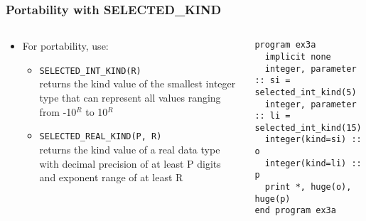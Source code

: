 \documentclass[10pt,aspectratio=169]{beamer}
\begin{document}
\begin{frame}[fragile]
  \frametitle{Portability with SELECTED\_KIND}
  \begin{columns}[T]
    \begin{column}{0.43\textwidth}
      \begin{itemize}
        \item For portability, use:
          \begin{itemize}
          \vspace*{2mm}
            \item \texttt{SELECTED\_INT\_KIND(R)} \\
            returns the kind value of the smallest integer type that can represent all values ranging from -10$^R$ to 10$^R$
            \vspace*{2mm}
            \item \texttt{SELECTED\_REAL\_KIND(P, R)} \\
            returns the kind value of a real data type with decimal precision of at least P digits and exponent range of at least R
          \end{itemize}
      \end{itemize}
    \end{column}

    \begin{column}{0.57\textwidth}
      \begin{lstlisting}
program ex3a
  implicit none
  integer, parameter :: si = selected_int_kind(5)
  integer, parameter :: li = selected_int_kind(15)
  integer(kind=si) :: o
  integer(kind=li) :: p
  print *, huge(o), huge(p)
end program ex3a
      \end{lstlisting}
    \end{column}
  \end{columns}
\end{frame}
\end{document}
